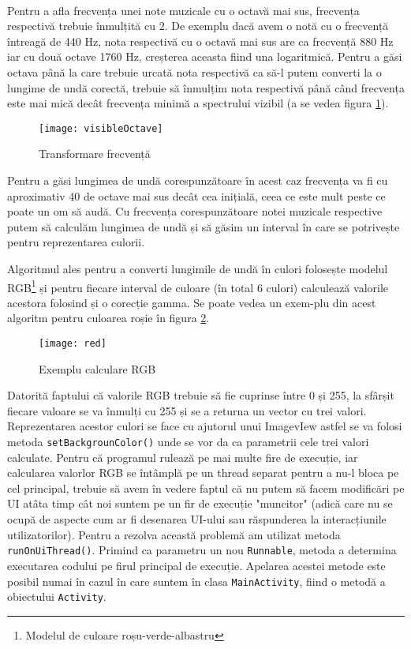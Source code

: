 \documentclass[../IoMusT.tex]{subfiles}
\begin{document}
\\
\par Pentru a afla frecvența unei note muzicale cu o octavă mai sus, frecvența respectivă trebuie înmulțită cu 2. De exemplu dacă avem o notă cu o frecvență întreagă de 440 Hz, nota respectivă cu o octavă mai sus are ca frecvență 880 Hz iar cu două octave 1760 Hz, creșterea aceasta fiind una lo\-ga\-rit\-mi\-că. Pentru a găsi octava până la care trebuie urcată nota res\-pec\-tiv\-ă ca să-l putem converti la o lungime de undă corectă, trebuie să înmulțim nota respectivă până când frecvența este mai mică decât frecvența minimă a spectrului vizibil (a se vedea figura \ref{fig:visibleOctave}).
\begin{figure}[h]
\centering
\texttt{[image: visibleOctave]}
\caption{Transformare frecvență}
\label{fig:visibleOctave}
\end{figure} 
Pentru a găsi lungimea de undă corespunzătoare în acest caz frecvența va fi cu aproximativ 40 de octave mai sus decât cea inițială, ceea ce este mult peste ce poate un om să audă. Cu frecvența corespunzătoare notei muzicale respective putem să calculăm lungimea de undă și să găsim un interval în care se potrivește pentru reprezentarea culorii.
\\
\par Algoritmul ales pentru a converti lungimile de undă în culori folosește modelul RGB\footnote{Modelul de culoare roșu-verde-albastru} și pentru fiecare interval de culoare (în total 6 culori) calculează valorile acestora folosind și o corecție gamma. Se poate vedea un e\-xem-plu din acest algoritm pentru culoarea roșie în figura \ref{fig:red}.
\begin{figure}[h]
\centering
\texttt{[image: red]}
\caption{Exemplu calculare RGB}
\label{fig:red}
\end{figure} 
Datorită faptului că valorile RGB trebuie să fie cuprinse între 0 și 255, la sfârșit fiecare valoare se va înmulți cu 255 și se a returna un vector cu trei valori. Reprezentarea acestor culori se face cu ajutorul unui ImagevIew astfel se va folosi metoda \verb|setBackgrounColor()| unde se vor da ca parametrii cele trei valori calculate. Pentru că programul rulează pe mai multe fire de execuție, iar calcularea valorlor RGB se întâmplă pe un thread separat pentru a nu-l bloca pe cel principal, trebuie să avem în vedere faptul că nu putem să facem modificări pe UI atâta timp cât noi suntem pe un fir de execuție "muncitor" (adică care nu se ocupă de aspecte cum ar fi desenarea UI-ului sau răspunderea la interacțiunile utilizatorilor). Pentru a rezolva această problemă am utilizat metoda \verb|runOnUiThread()|. Primind ca parametru un nou \verb|Runnable|, metoda a determina executarea codului pe firul principal de execuție. Apelarea acestei metode este posibil numai în cazul în care suntem în clasa \verb|MainActivity|, fiind o metodă a obiectului \verb|Activity|.
\end{document}
